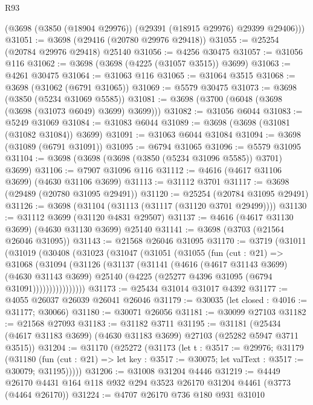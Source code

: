 \begin{lexlean}{R93}
\begin{coremodule}
      (@3698 (@3850 (@18904 @29976)) (@29391 (@18915 @29976) @29399 @29406)))
@31051 := @3698 (@29416 (@20780 @29976 @29418))
@31055 := @25254 (@20784 @29976 @29418) @25140
@31056 := @4256 @30475
@31057 := @31056 @116
@31062 := @3698 (@3698 (@4225 (@31057 @3515)) @3699)
@31063 := @4261 @30475
@31064 := @31063 @116
@31065 := @31064 @3515
@31068 := @3698 (@31062 (@6791 @31065))
@31069 := @5579 @30475
@31073 := @3698 (@3850 (@5234 @31069 @5585))
@31081 := @3698 (@3700 (@6048 (@3698 (@3698 (@31073 @6049) @3699) @3699)))
@31082 := @31056 @6044
@31083 := @5249 @31069
@31084 := @31083 @6044
@31089 := @3698 (@3698 (@31081 (@31082 @31084)) @3699)
@31091 := @31063 @6044 @31084
@31094 := @3698 (@31089 (@6791 @31091))
@31095 := @6794 @31065
@31096 := @5579 @31095
@31104 := @3698 (@3698 (@3698 (@3850 (@5234 @31096 @5585)) @3701) @3699)
@31106 := @7907 @31096 @116
@31112 := @4616 (@4617 @31106 @3699) (@4630 @31106 @3699)
@31113 := @31112 @3701
@31117 := @3698 (@29489 (@20780 @31095 @29491))
@31120 := @25254 (@20784 @31095 @29491)
@31126 := @3698 (@31104 (@31113 (@31117 (@31120 @3701 @29499))))
@31130 := @31112 @3699 (@31120 @4831 @29507)
@31137 := @4616 (@4617 @31130 @3699) (@4630 @31130 @3699) @25140
@31141 := @3698 (@3703 (@21564 @26046 @31095))
@31143 := @21568 @26046 @31095
@31170 := @3719
    (@31011
      (@31019
        (@30408
          (@31023
            (@31047
              (@31051
                (@31055
                  (fun (cut : @21) =>
                  @31068
                    (@31094
                      (@31126
                        (@31137
                          (@31141
                            (@4616
                              (@4617 @31143 @3699)
                              (@4630 @31143 @3699)
                              @25140
                              (@4225 (@25277 @4396 @31095 (@6794 @31091))))))))))))))))
@31173 := @25434 @31014 @31017 @4392
@31177 := @4055 @26037 @26039 @26041 @26046
@31179 := @30035 (let closed : @4016 := @31177; @30066)
@31180 := @30071 @26056
@31181 := @30099 @27103
@31182 := @21568 @27093
@31183 := @31182 @3711
@31195 := @31181
    (@25434 (@4617 @31183 @3699) (@4630 @31183 @3699) @27103 (@25282 @5947 @3711 @3515))
@31204 := @31170
    (@25272
      (@31173
        (let t : @3517 := @29976;
        @31179
          (@31180
            (fun (cut : @21) =>
            let key : @3517 := @30075; let valText : @3517 := @30079; @31195)))))
@31206 := @31008 @31204 @4446
@31219 := @4449 @26170 @4431 @164 @118 @932 @294 @3523 @26170 @31204 @4461 (@3773 (@4464 @26170))
@31224 := @4707 @26170 @736 @180 @931 @31010

\end{coremodule}
\end{lexlean}
